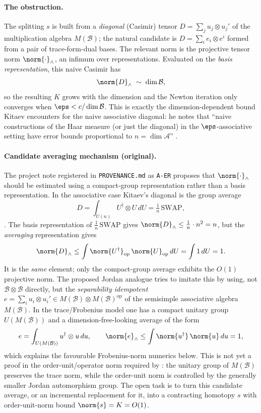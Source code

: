 \paragraph{The obstruction.}
The splitting $s$ is built from a \emph{diagonal} (Casimir) tensor
$D=\sum_{j}u_{j}\otimes u_{j}'$ of the multiplication algebra $M(\mathcal{B})$;
the natural candidate is $D=\sum_{i}e_{i}\otimes e^{i}$ formed from a pair of
trace-form-dual bases. The relevant norm is the projective tensor norm
$\norm{\cdot}_{\wedge}$, an infimum over representations. Evaluated on the
\emph{basis representation}, this naive Casimir has
\[
   \norm{D}_{\wedge}\;\sim\;\dim\mathcal{B},
\]
so the resulting $K$ grows with the dimension and the Newton iteration only
converges when $\eps<c/\dim\mathcal{B}$. This is exactly the dimension-dependent
bound Kitaev encounters for the naive associative diagonal: he notes that
``naive constructions of the Haar measure (or just the diagonal) in the
$\eps$-associative setting have error bounds proportional to
$n=\dim\mathcal{A}$'' \cite{Kitaev2024}.

\paragraph{Candidate averaging mechanism (original).}
The project note registered in \texttt{PROVENANCE.md} as \texttt{A-ER} proposes
that $\norm{\cdot}_{\wedge}$ should be estimated using a compact-group
representation rather than a basis representation. In the associative case
Kitaev's diagonal is the group average
\[
   D=\int_{U(n)}U^{\dagger}\otimes U\,dU=\tfrac1n\,\mathrm{SWAP},
\]
\cite{Kitaev2024}. The basis representation of $\tfrac1n\,\mathrm{SWAP}$ gives
$\norm{D}_{\wedge}\le\tfrac1n\cdot n^{2}=n$, but the \emph{averaging}
representation gives
\[
   \norm{D}_{\wedge}\le\int\norm{U^{\dagger}}_{\mathrm{op}}\,
   \norm{U}_{\mathrm{op}}\,dU=\int 1\,dU=1 .
\]
It is the \emph{same} element; only the compact-group average exhibits the
$O(1)$ projective norm. The proposed Jordan analogue tries to imitate this by
using, not $\mathcal{B}\otimes\mathcal{B}$ directly, but the
\emph{separability idempotent}
$e=\sum_{i}u_{i}\otimes u_{i}'\in M(\mathcal{B})\otimes M(\mathcal{B})^{\mathrm{op}}$
of the semisimple associative algebra $M(\mathcal{B})$. In the trace/Frobenius
model one has a compact unitary group $U(M(\mathcal{B}))$ and a
dimension-free-looking average of the form
\[
   e=\int_{U(M(\mathcal{B}))}u^{\dagger}\otimes u\,du,
   \qquad
   \norm{e}_{\wedge}\le\int\norm{u^{\dagger}}\,\norm{u}\,du=1,
\]
which explains the favourable Frobenius-norm numerics below. This is not yet a
proof in the order-unit/operator norm required by :
the unitary group of $M(\mathcal{B})$ preserves the trace norm, while the
order-unit norm is controlled by the generally smaller Jordan automorphism
group. The open task is to turn this candidate average, or an incremental
replacement for it, into a contracting homotopy $s$ with order-unit-norm bound
$\norm{s}=K=O(1)$.

